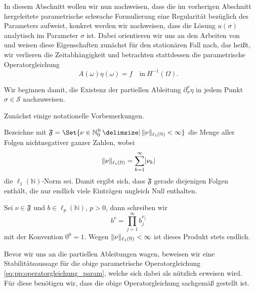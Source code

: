 In diesem Abschnitt wollen wir nun nachweisen, dass die im vorherigen Abschnitt hergeleitete parametrische schwache Formulierung eine Regularität bezüglich des Parameters aufweist, konkret werden wir nachweisen, dass die Lösung $u(\sigma)$ analytisch im Parameter $\sigma$ ist.
Dabei orientieren wir uns an den Arbeiten von \textcite{Cohen:2010kz,Kunoth:2013ef} und weisen diese Eigenschaften zunächst für den stationären Fall nach, das heißt, wir verlieren die Zeitabhängigkeit und betrachten stattdessen die parametrische Operatorgleichung
\begin{equation}
\label{eq:pp:operatorgleichung_param}
    A(\omega) \eta(\omega) = f \quad \text{in}~H^{-1}(\Omega).
\end{equation}

Wir beginnen damit, die Existenz der partiellen Ableitung $\partial^{\nu}_{\sigma} \eta$ in jedem Punkt $\sigma \in \mathcal S$ nachzuweisen.

Zunächst einige notationelle Vorbemerkungen.
\begin{Bemerkung}
    Bezeichne mit $\mathfrak F = \Set{ \nu \in \mathbb{N}^{\mathbb{N}}_{0} \given \norm{\nu}_{\ell_{1}(\mathbb{N})} < \infty }$ die Menge aller Folgen nichtnegativer ganzer Zahlen, wobei
    \begin{equation}
        \lVert\nu\rVert_{\ell_{1}(\mathbb{N})} = \sum_{k = 1}^{\infty} \lvert\nu_{k}\rvert
    \end{equation}
    die $\ell_{1}(\mathbb{N})$-Norm sei.
    Damit ergibt sich, dass $\mathfrak F$ gerade diejenigen Folgen enthält, die nur endlich viele Einträgen ungleich Null enthalten.

    Sei $\nu \in \mathfrak F$ und $b \in \ell_{p}(\mathbb{N})$, $p > 0$, dann schreiben wir
    \begin{equation}
        b^{\nu} = \prod_{j = 1}^{\infty} b_{j}^{\nu_{j}}
    \end{equation}
    mit der Konvention $0^{0} = 1$.
    Wegen $\lVert\nu\rVert_{\ell_{1}(\mathbb{N})} < \infty$ ist dieses Produkt stets endlich.
\end{Bemerkung}

Bevor wir uns an die partiellen Ableitungen wagen, beweisen wir eine Stabilitätsaussage für die obige parametrische Operatorgleichung \cref{eq:pp:operatorgleichung_param}, welche sich dabei als nützlich erweisen wird.
Für diese benötigen wir, dass die obige Operatorgleichung sachgemäß gestellt ist.

